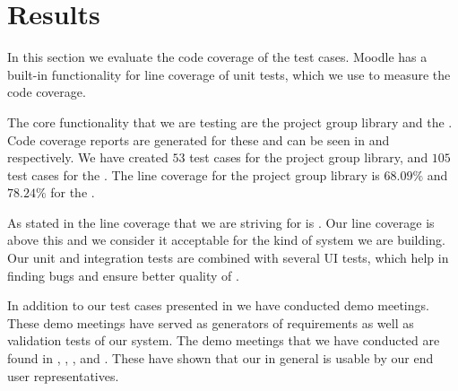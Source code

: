 \section{Results}
\label{sec:results}
In this section we evaluate the code coverage of the test cases. 
Moodle has a built-in functionality for line coverage of unit tests, which we use to measure the code coverage.

The core functionality that we are testing are the project group library and the \admlib{}.
Code coverage reports are generated for these and can be seen in  and  respectively.
We have created $53$ test cases for the project group library, and $105$ test cases for the \admlib{}.
The line coverage for the project group library is $68.09\%$ and $78.24\%$ for the \admlib{}.

As stated in  the line coverage that we are striving for is \idealCC{}.
Our line coverage is above this and we consider it acceptable for the kind of system we are building. 
Our unit and integration tests are combined with several UI tests, which help in finding bugs and ensure better quality of \system{}.

In addition to our test cases presented in  we have conducted demo meetings.
These demo meetings have served as generators of requirements as well as validation tests of our system.
The demo meetings that we have conducted are found in , , ,  and .
These have shown that our \subsystem{} in general is usable by our end user representatives.